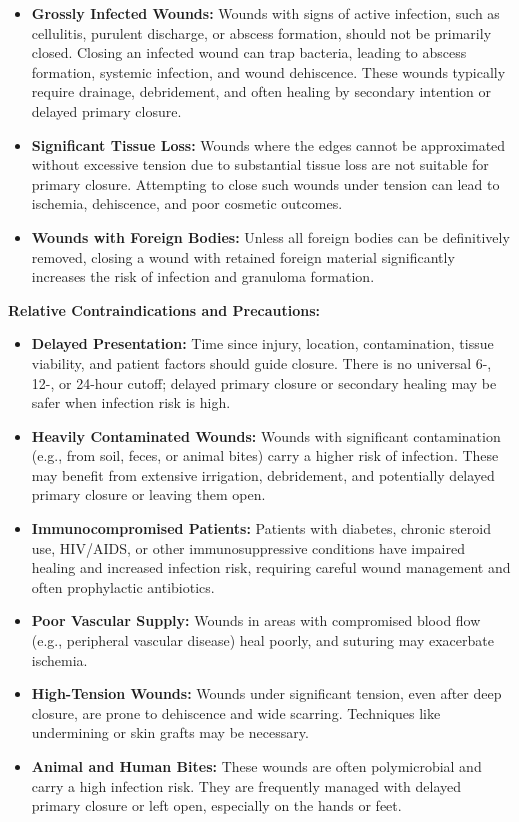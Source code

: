 \begin{itemize}
  \item \textbf{Grossly Infected Wounds:} Wounds with signs of active infection, such as cellulitis, purulent discharge, or abscess formation, should not be primarily closed. Closing an infected wound can trap bacteria, leading to abscess formation, systemic infection, and wound dehiscence. These wounds typically require drainage, debridement, and often healing by secondary intention or delayed primary closure.
  
  \item \textbf{Significant Tissue Loss:} Wounds where the edges cannot be approximated without excessive tension due to substantial tissue loss are not suitable for primary closure. Attempting to close such wounds under tension can lead to ischemia, dehiscence, and poor cosmetic outcomes.
  
  \item \textbf{Wounds with Foreign Bodies:} Unless all foreign bodies can be definitively removed, closing a wound with retained foreign material significantly increases the risk of infection and granuloma formation.
\end{itemize}

\textbf{Relative Contraindications and Precautions:}

\begin{itemize}
  \item \textbf{Delayed Presentation:} Time since injury, location, contamination, tissue viability, and patient factors should guide closure. There is no universal 6-, 12-, or 24-hour cutoff; delayed primary closure or secondary healing may be safer when infection risk is high.
  
  \item \textbf{Heavily Contaminated Wounds:} Wounds with significant contamination (e.g., from soil, feces, or animal bites) carry a higher risk of infection. These may benefit from extensive irrigation, debridement, and potentially delayed primary closure or leaving them open.
  
  \item \textbf{Immunocompromised Patients:} Patients with diabetes, chronic steroid use, HIV/AIDS, or other immunosuppressive conditions have impaired healing and increased infection risk, requiring careful wound management and often prophylactic antibiotics.
  
  \item \textbf{Poor Vascular Supply:} Wounds in areas with compromised blood flow (e.g., peripheral vascular disease) heal poorly, and suturing may exacerbate ischemia.
  
  \item \textbf{High-Tension Wounds:} Wounds under significant tension, even after deep closure, are prone to dehiscence and wide scarring. Techniques like undermining or skin grafts may be necessary.
  
  \item \textbf{Animal and Human Bites:} These wounds are often polymicrobial and carry a high infection risk. They are frequently managed with delayed primary closure or left open, especially on the hands or feet.
\end{itemize}


